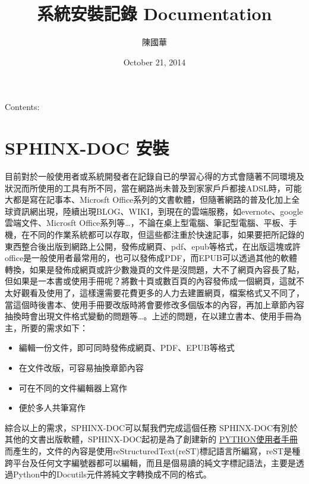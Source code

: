 \documentclass[letterpaper,10pt,english]{sphinxmanual}
\title{系統安裝記錄 Documentation}
\date{October 21, 2014}
\author{陳國華}
\begin{document}
\maketitle
\tableofcontents
{}\label{index::doc}


Contents:


\chapter{SPHINX-DOC 安裝}
\label{_doc/sphinx-doc/index:welcome-to-s-documentation}\label{_doc/sphinx-doc/index::doc}\label{_doc/sphinx-doc/index:sphinx-doc}
目前對於一般使用者或系統開發者在記錄自已的學習心得的方式會隨著不同環境及狀況而所使用的工具有所不同，當在網路尚未普及到家家戶戶都接ADSL時，可能大都是寫在記事本、Microsft Office系列的文書軟體，但隨著網路的普及化加上全球資訊網出現，陸續出現BLOG、WIKI，到現在的雲端服務，如evernote、google雲端文件、Microsft Office系列等…，不論在桌上型電腦、筆記型電腦、平板、手機，在不同的作業系統都可以存取，但這些都注重於快速記事，如果要把所記錄的東西整合後出版到網路上公開，發佈成網頁、pdf、epub等格式，在出版這塊或許office是一般使用者最常用的，也可以發佈成PDF，而EPUB可以透過其他的軟體轉換，如果是發佈成網頁或許少數幾頁的文件是沒問題，大不了網頁內容長了點，但如果是一本書或使用手冊呢？將數十頁或數百頁的內容發佈成一個網頁，這就不太好觀看及使用了，這樣還需要花費更多的人力去建置網頁，檔案格式又不同了，當這個時後書本、使用手冊要改版時將會要修改多個版本的內容，再加上章節內容抽換時會出現文件格式變動的問題等…。上述的問題，在以建立書本、使用手冊為主，所要的需求如下：
\begin{itemize}
\item {} 
編輯一份文件，即可同時發佈成網頁、PDF、EPUB等格式

\item {} 
在文件改版，可容易抽換章節內容

\item {} 
可在不同的文件編輯器上寫作

\item {} 
便於多人共筆寫作

\end{itemize}

綜合以上的需求，SPHINX-DOC可以幫我們完成這個任務
SPHINX-DOC有別於其他的文書出版軟體，SPHINX-DOC起初是為了創建新的 \href{https://doc.python.org/3.5/index.html}{PYTHON使用者手冊} 而產生的，文件的內容是使用reStructuredText(reST)標記語言所編寫，reST是種跨平台及任何文字編號器都可以編輯，而且是個易讀的純文字標記語法，主要是透過Python中的Docutils元件將純文字轉換成不同的格式。
\end{document}
